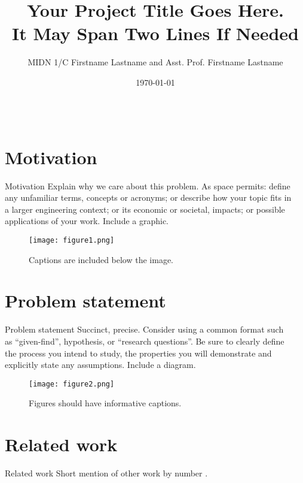 \documentclass[pdf]{beamer}
\title{\huge Your Project Title Goes Here.\\ It May Span Two Lines If Needed}
\author{MIDN 1/C Firstname Lastname and Asst. Prof. Firstname Lastname}
\institute[WRCE]{$^{1}$Weapons, Robotics, and Control Engineering, United States Naval Academy}
\date{\today}
\begin{document}
\begin{frame}[fragile]
\begin{columns}

\begin{column}{0.25\textwidth}
\section{Motivation}
\begin{block}{Motivation}
Explain why we care about this problem.  As space permits: define any unfamiliar terms, concepts or acronyms; or describe how your topic fits in a larger engineering context; or its economic or societal, impacts; or possible applications of your work.  Include a graphic.
\begin{figure}
\texttt{[image: figure1.png]}
\caption{Captions are included below the image.}
\end{figure}
\end{block}

\section{Problem statement}
\begin{block}{Problem statement}
Succinct, precise. Consider using a common format such as ``given-find'', hypothesis, or ``research questions''. Be sure to clearly define the process you intend to study, the properties you will demonstrate and explicitly state any assumptions.  Include a diagram. 
\begin{figure}
\texttt{[image: figure2.png]}
\caption{Figures should have informative captions.}
\end{figure}
\end{block}

\section{Related work}
\begin{block}{Related work}
Short mention of other work by number \cite{chen1993linear,chen1965automatic}. %
\end{block}
\end{column}

\begin{column}{0.25\textwidth}

\end{column}
\end{columns}
\end{frame}
\end{document}
